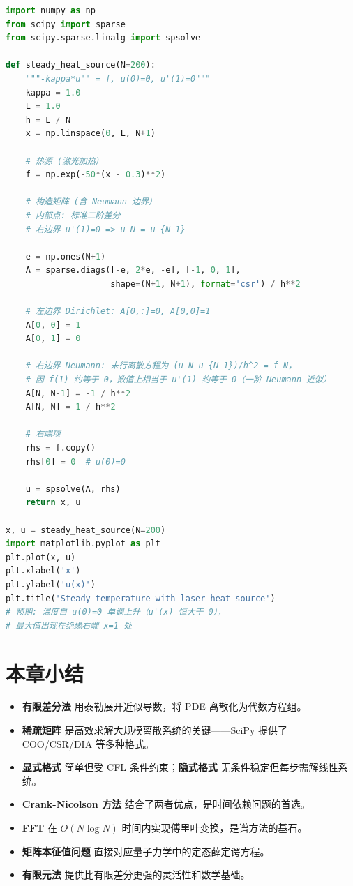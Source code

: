 \begin{lstlisting}[language=Python, caption=稳态热传导边值问题]
import numpy as np
from scipy import sparse
from scipy.sparse.linalg import spsolve

def steady_heat_source(N=200):
    """-kappa*u'' = f, u(0)=0, u'(1)=0"""
    kappa = 1.0
    L = 1.0
    h = L / N
    x = np.linspace(0, L, N+1)

    # 热源 (激光加热)
    f = np.exp(-50*(x - 0.3)**2)

    # 构造矩阵 (含 Neumann 边界)
    # 内部点: 标准二阶差分
    # 右边界 u'(1)=0 => u_N = u_{N-1}

    e = np.ones(N+1)
    A = sparse.diags([-e, 2*e, -e], [-1, 0, 1],
                     shape=(N+1, N+1), format='csr') / h**2

    # 左边界 Dirichlet: A[0,:]=0, A[0,0]=1
    A[0, 0] = 1
    A[0, 1] = 0

    # 右边界 Neumann: 末行离散方程为 (u_N-u_{N-1})/h^2 = f_N，
    # 因 f(1) 约等于 0，数值上相当于 u'(1) 约等于 0（一阶 Neumann 近似）
    A[N, N-1] = -1 / h**2
    A[N, N] = 1 / h**2

    # 右端项
    rhs = f.copy()
    rhs[0] = 0  # u(0)=0

    u = spsolve(A, rhs)
    return x, u

x, u = steady_heat_source(N=200)
import matplotlib.pyplot as plt
plt.plot(x, u)
plt.xlabel('x')
plt.ylabel('u(x)')
plt.title('Steady temperature with laser heat source')
# 预期: 温度自 u(0)=0 单调上升（u'(x) 恒大于 0），
# 最大值出现在绝缘右端 x=1 处
\end{lstlisting}

\section{本章小结}

\begin{itemize}
\item \textbf{有限差分法} 用泰勒展开近似导数，将 PDE 离散化为代数方程组。
\item \textbf{稀疏矩阵} 是高效求解大规模离散系统的关键——SciPy 提供了 COO/CSR/DIA 等多种格式。
\item \textbf{显式格式} 简单但受 CFL 条件约束；\textbf{隐式格式} 无条件稳定但每步需解线性系统。
\item \textbf{Crank-Nicolson 方法} 结合了两者优点，是时间依赖问题的首选。
\item \textbf{FFT} 在 $O(N\log N)$ 时间内实现傅里叶变换，是谱方法的基石。
\item \textbf{矩阵本征值问题} 直接对应量子力学中的定态薛定谔方程。
\item \textbf{有限元法} 提供比有限差分更强的灵活性和数学基础。
\end{itemize}


